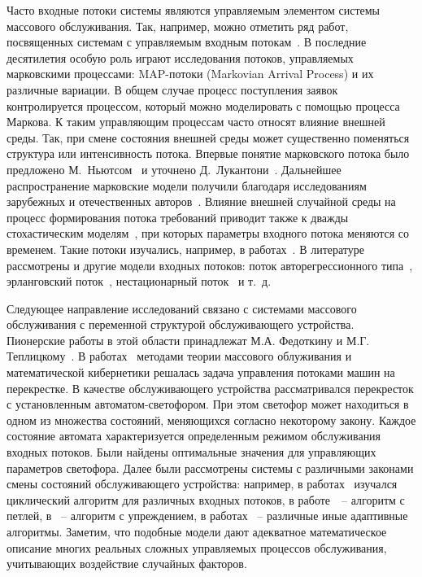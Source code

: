 Часто входные потоки системы являются управляемым элементом системы массового обслуживания. Так, например, можно отметить ряд работ, посвященных системам с управляемым входным потокам~\cite{Natan1966,Kovalenko1968,Kovalenko1971}. В последние десятилетия особую роль играют исследования потоков, управляемых марковскими процессами: MAP-потоки (Markovian Arrival Process) и их различные вариации. В общем случае процесс поступления заявок контролируется процессом, который можно моделировать   с помощью процесса Маркова. К таким управляющим процессам часто относят влияние внешней среды. Так, при смене состояния внешней среды может существенно поменяться структура или интенсивность потока. Впервые понятие марковского потока было предложено М.~Ньютсом~\cite{Neuts1979} и уточнено Д.~Лукантони~\cite{Lucantoni1990,Lucantoni1993}. Дальнейшее распространение марковские модели получили благодаря исследованиям зарубежных и отечественных авторов~\cite{Asmussen1993,Bocharov1997,Abolnikov2007,Nazarov2010,Moiseev2013,Dudin2015}. Влияние внешней случайной среды на процесс формирования потока требований приводит также к дважды стохастическим моделям~\cite{Grandell1976}, при которых параметры входного потока меняются со временем. Такие потоки изучались, например, в работах~\cite{Gorcev2013,Zorin2005,Golovko2009}. В литературе рассмотрены и другие модели входных потоков: поток авторегрессионного типа~\cite{Leontiev2016}, эрланговский	поток~\cite{Ushakov1977}, нестационарный поток~\cite{Davis1995} и т.~д.  

Следующее направление исследований связано с системами массового обслуживания с переменной структурой обслуживающего устройства. Пионерские работы в этой области принадлежат М.А. Федоткину и М.Г. Теплицкому~\cite{Teplicki1968,Teplicki1969}. В работах~\cite{Neimark1966,Fedotkin1969} методами теории массового облуживания и математической кибернетики решалась задача управления потоками машин на перекрестке. В качестве обслуживающего устройства рассматривался перекресток с установленным автоматом-светофором. При этом светофор может находиться в одном из множества состояний, меняющихся согласно некоторому закону. Каждое состояние автомата характеризуется определенным режимом обслуживания входных потоков. Были найдены оптимальные значения для управляющих параметров светофора. Далее были рассмотрены системы с различными законами смены состояний обслуживающего устройства: например, в работах~\cite{Proidakova2008,Fedotkin2014,Zorin2014} изучался циклический алгоритм для различных входных потоков, в работе~\cite{Zorin2017}~-- алгоритм с петлей, в~\cite{Kuvykina1990} -- алгоритм с упреждением, в работах~\cite{Kudelin1996,Litvak2000,Golysheva2010} -- различные иные адаптивные алгоритмы. Заметим, что подобные модели дают адекватное математическое описание многих реальных сложных управляемых процессов обслуживания, учитывающих воздействие случайных факторов. 

